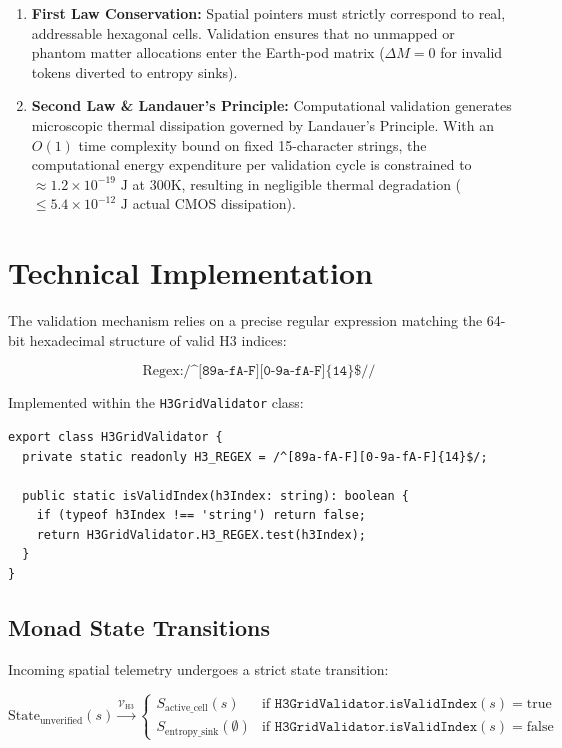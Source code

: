 \documentclass[11pt, a4paper]{article}
\begin{document}
\begin{enumerate}
    \item \textbf{First Law Conservation:} Spatial pointers must strictly correspond to real, addressable hexagonal cells. Validation ensures that no unmapped or phantom matter allocations enter the Earth-pod matrix ($\Delta M = 0$ for invalid tokens diverted to entropy sinks).
    \item \textbf{Second Law \& Landauer's Principle:} Computational validation generates microscopic thermal dissipation governed by Landauer's Principle. With an $O(1)$ time complexity bound on fixed 15-character strings, the computational energy expenditure per validation cycle is constrained to $\approx 1.2 \times 10^{-19} \text{ J}$ at $300\text{K}$, resulting in negligible thermal degradation ($\le 5.4 \times 10^{-12} \text{ J}$ actual CMOS dissipation).
\end{enumerate}

\section{Technical Implementation}
The validation mechanism relies on a precise regular expression matching the 64-bit hexadecimal structure of valid H3 indices:

\begin{equation}
\text{Regex}: \texttt{/\textasciicircum[89a-fA-F][0-9a-fA-F]\{14\}\$//}
\end{equation}

Implemented within the \texttt{H3GridValidator} class:

\begin{lstlisting}
export class H3GridValidator {
  private static readonly H3_REGEX = /^[89a-fA-F][0-9a-fA-F]{14}$/;

  public static isValidIndex(h3Index: string): boolean {
    if (typeof h3Index !== 'string') return false;
    return H3GridValidator.H3_REGEX.test(h3Index);
  }
}
\end{lstlisting}

\subsection{Monad State Transitions}
Incoming spatial telemetry undergoes a strict state transition:

\begin{equation}
\text{State}_{\text{unverified}}(s) \xrightarrow{\mathcal{V}_{\text{H3}}} \begin{cases} 
S_{\text{active\_cell}}(s) & \text{if } \texttt{H3GridValidator.isValidIndex}(s) = \text{true} \\ 
S_{\text{entropy\_sink}}(\emptyset) & \text{if } \texttt{H3GridValidator.isValidIndex}(s) = \text{false} 
\end{cases}
\end{equation}
\end{document}
